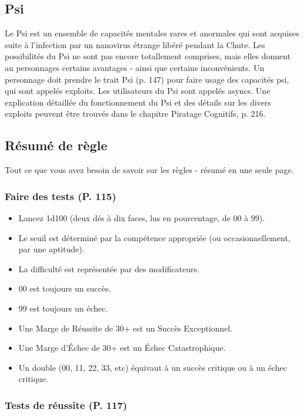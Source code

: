 \subsection{Psi} \label{sec:psi} 

Le Psi est un ensemble de capacités mentales rares et anormales qui sont acquises suite à l'infection par un nanovirus étrange libéré pendant la Chute. Les possibilités du Psi ne sont pas encore totallement comprises, mais elles donnent au personnages certains avantages - ainsi que certains inconvénients. Un personnage doit prendre le trait Psi (p. 147) pour faire usage des capacités psi, qui sont appelés exploits. Les utilisateurs du Psi sont appelés asyncs. Une explication détaillée du fonctionnement du Psi et des détails sur les divers exploits peuvent être trouvés dans le chapitre Piratage Cognitifs, p. 216. 

\subsection{Résumé de règle} \label{sec:game-rules-summary} 

Tout ce que vous avez besoin de savoir sur les règles - résumé en une seule page. 

\subsubsection{Faire des tests (P. 115)} 

\begin{itemize} \item Lancez 1d100 (deux dés à dix faces, lus en pourcentage, de 00 à 99). \item Le seuil est déterminé par la compétence appropriée (ou occasionnellement, par une aptitude). \item La difficulté est représentée par des modificateurs. \item 00 est toujours un succès. \item 99 est toujours un échec. \item Une Marge de Réussite de 30+ est un Succès Exceptionnel. \item Une Marge d'Échec de 30+ est un Échec Catastrophique. \item Un double (00, 11, 22, 33, etc) équivaut à un succès critique ou à un échec critique. \end{itemize} 

\subsubsection{Tests de réussite (P. 117)} 

